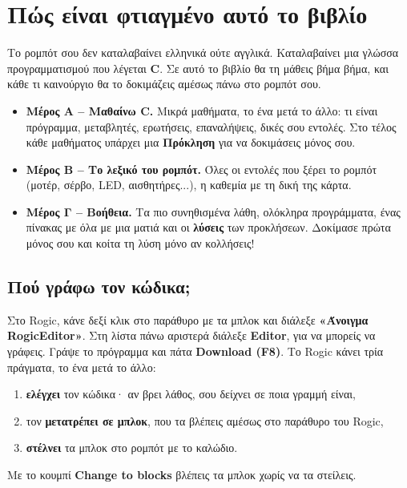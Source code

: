 \documentclass[11pt,a4paper]{article}
\begin{document}
\setcounter{tocdepth}{1}
{\hypersetup{linkcolor=black}\tableofcontents}
\newpage

\section*{Πώς είναι φτιαγμένο αυτό το βιβλίο}

Το ρομπότ σου δεν καταλαβαίνει ελληνικά ούτε αγγλικά. Καταλαβαίνει μια γλώσσα προγραμματισμού που
λέγεται \textbf{C}. Σε αυτό το βιβλίο θα τη μάθεις βήμα βήμα, και κάθε τι καινούργιο θα το δοκιμάζεις
αμέσως πάνω στο ρομπότ σου.

\begin{itemize}[leftmargin=1.4em, itemsep=4pt]
  \item \textbf{\color{robBlue}Μέρος Α – Μαθαίνω C.} Μικρά μαθήματα, το ένα μετά το άλλο: τι είναι πρόγραμμα,
        μεταβλητές, ερωτήσεις, επαναλήψεις, δικές σου εντολές. Στο τέλος κάθε μαθήματος υπάρχει μια
        \textbf{\color{robOrange}Πρόκληση} για να δοκιμάσεις μόνος σου.
  \item \textbf{\color{robTeal}Μέρος Β – Το λεξικό του ρομπότ.} Όλες οι εντολές που ξέρει το ρομπότ
        (μοτέρ, σέρβο, LED, αισθητήρες...), η καθεμία με τη δική της κάρτα.
  \item \textbf{\color{robPurple}Μέρος Γ – Βοήθεια.} Τα πιο συνηθισμένα λάθη, ολόκληρα προγράμματα,
        ένας πίνακας με όλα με μια ματιά και οι \textbf{λύσεις} των προκλήσεων. Δοκίμασε πρώτα μόνος σου
        και κοίτα τη λύση μόνο αν κολλήσεις!
\end{itemize}

\subsection*{Πού γράφω τον κώδικα;}
Στο Rogic, κάνε δεξί κλικ στο παράθυρο με τα μπλοκ και διάλεξε \textbf{«Άνοιγμα RogicEditor»}. Στη λίστα
πάνω αριστερά διάλεξε \textbf{Editor}, για να μπορείς να γράφεις. Γράψε το πρόγραμμα και πάτα
\textbf{Download (F8)}. Το Rogic κάνει τρία πράγματα, το ένα μετά το άλλο:
\begin{enumerate}[leftmargin=1.6em]
  \item \textbf{ελέγχει} τον κώδικα· αν βρει λάθος, σου δείχνει σε ποια γραμμή είναι,
  \item τον \textbf{μετατρέπει σε μπλοκ}, που τα βλέπεις αμέσως στο παράθυρο του Rogic,
  \item \textbf{στέλνει} τα μπλοκ στο ρομπότ με το καλώδιο.
\end{enumerate}
Με το κουμπί \textbf{Change to blocks} βλέπεις τα μπλοκ χωρίς να τα στείλεις.
\end{document}
